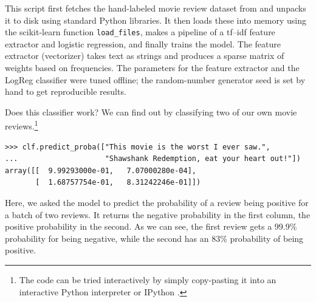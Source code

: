 \documentclass[a4paper]{article}
\begin{document}
%
%

This script first fetches the hand-labeled movie review dataset from
\cite{pang2004} and unpacks it to disk using standard Python libraries.
It then loads these into memory using the scikit-learn function
\texttt{load\_files}, makes a pipeline of a \textsf{tf--idf} feature extractor
\cite{rennie2003tackling} and logistic regression,
and finally trains the model.
The feature extractor (vectorizer) takes text as strings
and produces a sparse matrix of weights based on frequencies.
The parameters for the feature extractor and the LogReg classifier
were tuned offline; the random-number generator seed is set by hand
to get reproducible results.

Does this classifier work?
We can find out by classifying two of our own movie reviews.\footnote{
  The code can be tried interactively by simply copy-pasting it
  into an interactive Python interpreter or IPython \cite{perez2007ipython}.
}

\begin{lstlisting}
>>> clf.predict_proba(["This movie is the worst I ever saw.",
...                    "Shawshank Redemption, eat your heart out!"])
array([[  9.99293000e-01,   7.07000280e-04],
       [  1.68757754e-01,   8.31242246e-01]])
\end{lstlisting}

Here, we asked the model to predict the probability of a review being positive
for a batch of two reviews. It returns the negative probability in the first
column, the positive probability in the second.
As we can see, the first review gets a 99.9\% probability for being negative,
while the second has an 83\% probability of being positive.
\end{document}
